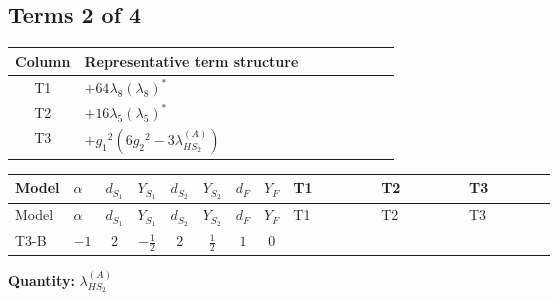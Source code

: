 \documentclass[8pt]{article}
\begin{document}
\begin{landscape}
\subsection*{Terms 2 of 4}
\begin{center}
\begin{tabular}{@{}c >{\raggedright\arraybackslash}p{0.82\linewidth}@{}}
\toprule
Column & Representative term structure \\
\midrule
T1 & \(\displaystyle +64 {\lambda_{8}} \left({\lambda_{8}}\right)^{*}\) \\
\midrule
T2 & \(\displaystyle +16 {\lambda_5} \left({\lambda_5}\right)^{*}\) \\
\midrule
T3 & \(\displaystyle +{g_1}^2 \left(6 {g_2}^2-3 {\lambda_{HS_2}^{(A)}}\right)\) \\
\midrule
\bottomrule
\end{tabular}
\end{center}
\smallskip
\tiny
\begin{longtable}{@{}llcccccc >{\raggedright\arraybackslash}p{0.21\linewidth} >{\raggedright\arraybackslash}p{0.21\linewidth} >{\raggedright\arraybackslash}p{0.21\linewidth}@{}}
\toprule
Model & $\alpha$ & $d_{S_1}$ & $Y_{S_1}$ & $d_{S_2}$ & $Y_{S_2}$ & $d_F$ & $Y_F$ & T1 & T2 & T3 \\
\midrule
\endfirsthead
\toprule
Model & $\alpha$ & $d_{S_1}$ & $Y_{S_1}$ & $d_{S_2}$ & $Y_{S_2}$ & $d_F$ & $Y_F$ & T1 & T2 & T3 \\
\midrule
\endhead
T3-B & $-1$ & $2$ & $-\frac{1}{2}$ & $2$ & $\frac{1}{2}$ & $1$ & $0$ & \scriptsize\adjustbox{max width=\linewidth}{$\begin{gathered} +64 {\lambda_{8}} \left({\lambda_{8}}\right)^{*}\end{gathered}$} & \scriptsize\adjustbox{max width=\linewidth}{$\begin{gathered} +16 {\lambda_5} \left({\lambda_5}\right)^{*}\end{gathered}$} & \scriptsize\adjustbox{max width=\linewidth}{$\begin{gathered} +{g_1}^2 \left(6 {g_2}^2-3 {\lambda_{HS_2}^{(A)}}\right)\end{gathered}$} \\
\midrule
\bottomrule
\end{longtable}
\clearpage
\noindent\textbf{Quantity: }$\lambda_{HS_2}^{(A)}$\par\smallskip

\end{landscape}
\end{document}
